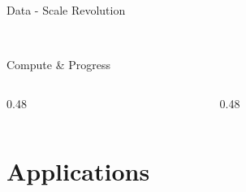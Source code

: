 \documentclass[compress, xcolor={svgnames}, aspectratio=169, smaller]{beamer}
\newcommand{\CommonPath}{../../Common}
\begin{document}
\begin{frame}{Data - Scale Revolution}

\begin{center}
\\[0.5em]

\end{center}

\end{frame}


\begin{frame}{Compute \& Progress}

\begin{columns}
    \begin{column}{0.48\textwidth}
        
    \end{column}
    \begin{column}{0.48\textwidth}

    \end{column}
\end{columns}

\end{frame}


\section{Applications}
\end{document}
